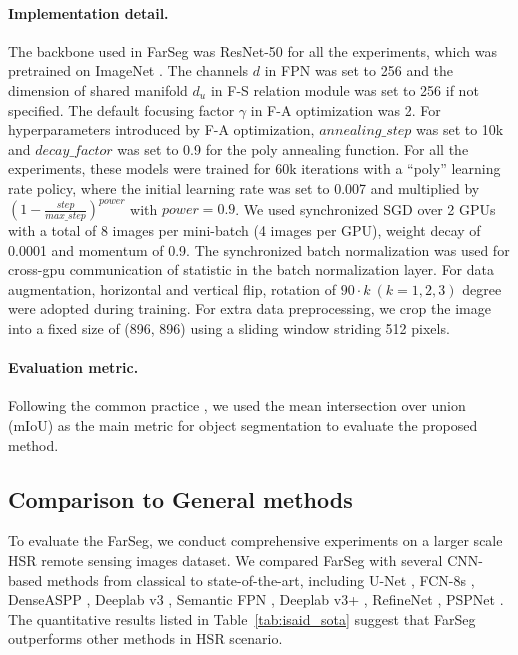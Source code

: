 \documentclass[10pt,twocolumn,letterpaper]{article}
\begin{document}
\paragraph{Implementation detail.}
The backbone used in FarSeg was ResNet-50 for all the experiments, which was pretrained on ImageNet \cite{deng2009imagenet}.
The channels $d$ in FPN was set to 256 and the dimension of shared manifold $d_u$ in F-S relation module was set to 256 if not specified.
The default focusing factor $\gamma$ in F-A optimization was 2.
For hyperparameters introduced by F-A optimization, $annealing\_step$ was set to 10k and $decay\_factor$ was set to 0.9 for the poly annealing function.
For all the experiments, these models were trained for 60k iterations with a ``poly'' learning rate policy, where the initial learning rate was set to 0.007 and multiplied by $(1 - \frac{step}{max\_step})^{power}$ with $power = 0.9$.
We used synchronized SGD over 2 GPUs with a total of 8 images per mini-batch (4 images per GPU), weight decay of 0.0001 and momentum of 0.9.
The synchronized batch normalization was used for cross-gpu communication of statistic in the batch normalization layer.
For data augmentation, horizontal and vertical flip, rotation of $90\cdot k~(k=1,2,3)$ degree were adopted during training.
For extra data preprocessing, we crop the image into a fixed size of (896, 896) using a sliding window striding 512 pixels.

\paragraph{Evaluation metric.}
Following the common practice \cite{everingham2015pascal, lin2014microsoft}, we used the mean intersection over union (mIoU) as the main metric for object segmentation to evaluate the proposed method.


\subsection{Comparison to General methods}
To evaluate the FarSeg, we conduct comprehensive experiments on a larger scale HSR remote sensing images dataset.
We compared FarSeg with several CNN-based methods from classical to state-of-the-art, including U-Net \cite{ronneberger2015u}, FCN-8s \cite{long2015fully}, DenseASPP \cite{yang2018denseaspp}, Deeplab v3 \cite{chen2017rethinking}, Semantic FPN \cite{kirillov2019panoptic}, Deeplab v3+ \cite{chen2018encoder}, RefineNet \cite{lin2017refinenet}, PSPNet \cite{zhao2017pyramid}.
The quantitative results listed in Table~\ref{tab:isaid_sota} suggest that FarSeg outperforms other methods in HSR scenario.
\end{document}
